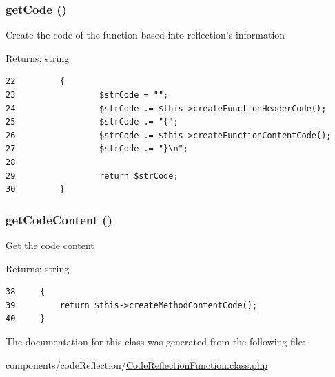 \hypertarget{class_code_reflection_function_b5e24da53b4a0d0848b18c1e832f47ff}{
\subsubsection[{getCode}]{\setlength{\rightskip}{0pt plus 5cm}getCode ()}}
\label{class_code_reflection_function_b5e24da53b4a0d0848b18c1e832f47ff}


Create the code of the function based into reflection's information

\begin{Desc}
\item[Returns:]string \end{Desc}


\begin{Code}\begin{verbatim}22         {
23                 $strCode = "";
24                 $strCode .= $this->createFunctionHeaderCode();
25                 $strCode .= "{";
26                 $strCode .= $this->createFunctionContentCode();
27                 $strCode .= "}\n";
28 
29                 return $strCode;
30         }
\end{verbatim}
\end{Code}


\hypertarget{class_code_reflection_function_5796d91d5436d3d7e80b65f0913f1873}{
\subsubsection[{getCodeContent}]{\setlength{\rightskip}{0pt plus 5cm}getCodeContent ()}}
\label{class_code_reflection_function_5796d91d5436d3d7e80b65f0913f1873}


Get the code content

\begin{Desc}
\item[Returns:]string \end{Desc}


\begin{Code}\begin{verbatim}38     {
39         return $this->createMethodContentCode();
40     }
\end{verbatim}
\end{Code}




The documentation for this class was generated from the following file:\begin{CompactItemize}
\item 
components/codeReflection/\hyperlink{_code_reflection_function_8class_8php}{CodeReflectionFunction.class.php}\end{CompactItemize}
